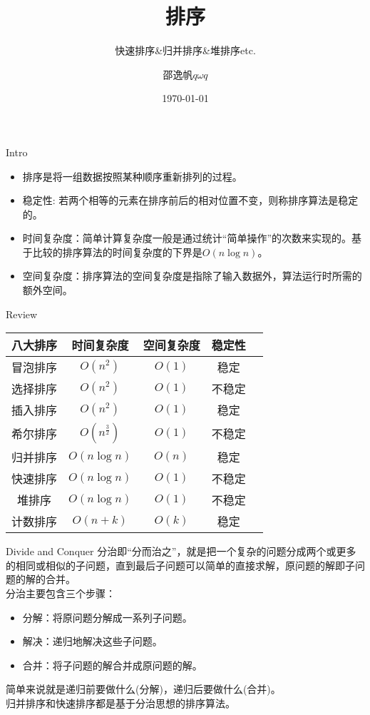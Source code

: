 \documentclass{ldr-simple-gray}
\title{排序}
\subtitle{快速排序\&归并排序\&堆排序etc.}
\author{邵逸帆$q\omega q$}
\institute[] {
  23电信基地班\\
  兰州大学算法与程序设计集训队
}
\date{\today}
\begin{document}
  \frame{\titlepage}

  \begin{frame}{Intro}
    \begin{itemize}
      \item 排序是将一组数据按照某种顺序重新排列的过程。
      \item 稳定性: 若两个相等的元素在排序前后的相对位置不变，则称排序算法是稳定的。
      \item 时间复杂度：简单计算复杂度一般是通过统计“简单操作”的次数来实现的。基于比较的排序算法的时间复杂度的下界是$O(n\log n)$。
      \item 空间复杂度：排序算法的空间复杂度是指除了输入数据外，算法运行时所需的额外空间。
    \end{itemize}
  \end{frame}

  \begin{frame}{Review}
    \begin{table}
      \centering
      \begin{tabular}{|c|c|c|c|c|}
        \hline
        八大排序 & 时间复杂度 & 空间复杂度 & 稳定性 \\
        \hline
        冒泡排序 & $O(n^2)$ & $O(1)$ & 稳定 \\
        选择排序 & $O(n^2)$ & $O(1)$ & 不稳定 \\
        插入排序 & $O(n^2)$ & $O(1)$ & 稳定 \\
        希尔排序 & $O(n^{\frac{3}{2}})$ & $O(1)$ & 不稳定 \\
        归并排序 & $O(n\log n)$ & $O(n)$ & 稳定 \\
        快速排序 & $O(n\log n)$ & $O(1)$ & 不稳定 \\
        堆排序 & $O(n\log n)$ & $O(1)$ & 不稳定 \\
        计数排序 & $O(n+k)$ & $O(k)$ & 稳定 \\
        \hline
      \end{tabular}
    \end{table}
  \end{frame}

  \begin{frame}{Divide and Conquer}
      分治即“分而治之”，就是把一个复杂的问题分成两个或更多的相同或相似的子问题，直到最后子问题可以简单的直接求解，原问题的解即子问题的解的合并。\\
      分治主要包含三个步骤：
      \begin{itemize}
        \item 分解：将原问题分解成一系列子问题。
        \item 解决：递归地解决这些子问题。
        \item 合并：将子问题的解合并成原问题的解。
      \end{itemize}
      简单来说就是递归前要做什么(分解)，递归后要做什么(合并)。\\
      归并排序和快速排序都是基于分治思想的排序算法。
    \end{frame}
\end{document}
